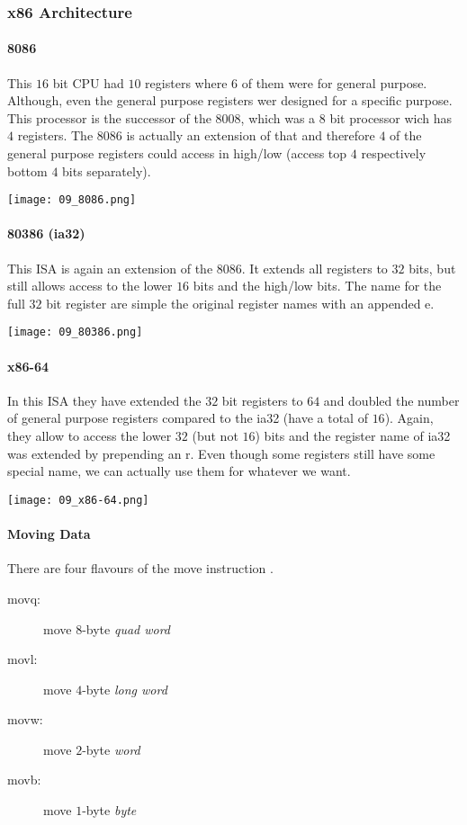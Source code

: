 \subsubsection{x86 Architecture}
\paragraph{8086}
This $16$ bit CPU had $10$ registers where $6$ of them were for general purpose. Although, even the general purpose registers wer designed for a specific purpose. This processor is the successor of the 8008, which was a $8$ bit processor wich has $4$ registers. The 8086 is actually an extension of that and therefore $4$ of the general purpose registers could access in high/low (access top $4$ respectively bottom $4$ bits separately).

\texttt{[image: 09\_8086.png]}

\paragraph{80386 (ia32)}
This ISA is again an extension of the 8086. It extends all registers to $32$ bits, but still allows access to the lower $16$ bits and the high/low bits. The name for the full $32$ bit register are simple the original register names with an appended e.

\texttt{[image: 09\_80386.png]}

\paragraph{x86-64}
In this ISA they have extended the $32$ bit registers to $64$ and doubled the number of general purpose registers compared to the ia32 (have a total of $16$). Again, they allow to access the lower $32$ (but not $16$) bits and the register name of ia32 was extended by prepending an r. Even though some registers still have some special name, we can actually use them for whatever we want.

\texttt{[image: 09\_x86-64.png]}

\paragraph{Moving Data}
There are four flavours of the move instruction .
\begin{description}
    \item[movq:] move $8$-byte \textit{quad word}
    \item[movl:] move $4$-byte \textit{long word}
    \item[movw:] move $2$-byte \textit{word}
    \item[movb:] move $1$-byte \textit{byte}
\end{description}

